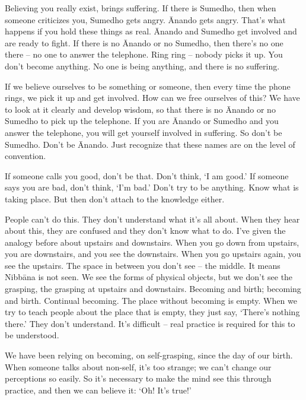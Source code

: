 Believing you really exist, brings suffering. If there is Sumedho, then when someone criticizes you, Sumedho gets angry. \=Anando gets angry. That's what happens if you hold these things as real. \=Anando and Sumedho get involved and are ready to fight. If there is no \=Anando or no Sumedho, then there's no one there -- no one to answer the telephone. Ring ring -- nobody picks it up. You don't become anything. No one is being anything, and there is no suffering.

If we believe ourselves to be something or someone, then every time the phone rings, we pick it up and get involved. How can we free ourselves of this? We have to look at it clearly and develop wisdom, so that there is no \=Anando or no Sumedho to pick up the telephone. If you are \=Anando or Sumedho and you answer the telephone, you will get yourself involved in suffering. So don't be Sumedho. Don't be \=Anando. Just recognize that these names are on the level of convention.

If someone calls you good, don't be that. Don't think, `I am good.' If someone says you are bad, don't think, `I'm bad.' Don't try to be anything. Know what is taking place. But then don't attach to the knowledge either.

People can't do this. They don't understand what it's all about. When they hear about this, they are confused and they don't know what to do. I've given the analogy before about upstairs and downstairs. When you go down from upstairs, you are downstairs, and you see the downstairs. When you go upstairs again, you see the upstairs. The space in between you don't see -- the middle. It means Nibb\=ana is not seen. We see the forms of physical objects, but we don't see the grasping, the grasping at upstairs and downstairs. Becoming and birth; becoming and birth. Continual becoming. The place without becoming is empty. When we try to teach people about the place that is empty, they just say, `There's nothing there.' They don't understand. It's difficult -- real practice is required for this to be understood.

We have been relying on becoming, on self-grasping, since the day of our birth. When someone talks about non-self, it's too strange; we can't change our perceptions so easily. So it's necessary to make the mind see this through practice, and then we can believe it: `Oh! It's true!'

